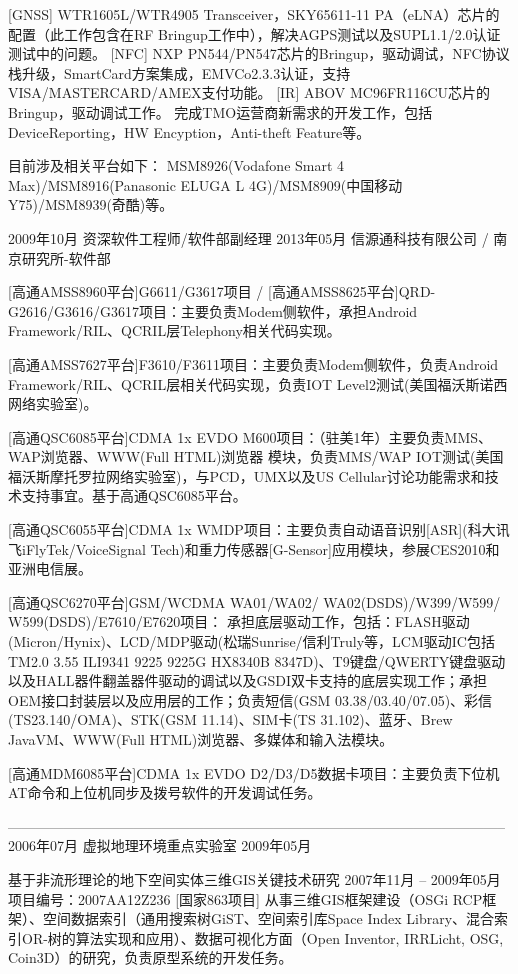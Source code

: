 \documentclass{resume}
\begin{document}
[GNSS] WTR1605L/WTR4905 Transceiver，SKY65611-11 PA（eLNA）芯片的配置（此工作包含在RF Bringup工作中），解决AGPS测试以及SUPL1.1/2.0认证测试中的问题。
[NFC] NXP PN544/PN547芯片的Bringup，驱动调试，NFC协议栈升级，SmartCard方案集成，EMVCo2.3.3认证，支持VISA/MASTERCARD/AMEX支付功能。
[IR] ABOV MC96FR116CU芯片的Bringup，驱动调试工作。
完成TMO运营商新需求的开发工作，包括DeviceReporting，HW Encyption，Anti-theft Feature等。

目前涉及相关平台如下：
MSM8926(Vodafone Smart 4 Max)/MSM8916(Panasonic ELUGA L 4G)/MSM8909(中国移动Y75)/MSM8939(奇酷)等。

2009年10月 		资深软件工程师/软件部副经理
2013年05月		信源通科技有限公司 / 南京研究所-软件部

[高通AMSS8960平台]G6611/G3617项目 / [高通AMSS8625平台]QRD-G2616/G3616/G3617项目：主要负责Modem侧软件，承担Android Framework/RIL、QCRIL层Telephony相关代码实现。

[高通AMSS7627平台]F3610/F3611项目：主要负责Modem侧软件，负责Android Framework/RIL、QCRIL层相关代码实现，负责IOT Level2测试(美国福沃斯诺西网络实验室)。

[高通QSC6085平台]CDMA 1x EVDO M600项目：（驻美1年）主要负责MMS、WAP浏览器、WWW(Full HTML)浏览器 模块，负责MMS/WAP IOT测试(美国福沃斯摩托罗拉网络实验室)，与PCD，UMX以及US Cellular讨论功能需求和技术支持事宜。基于高通QSC6085平台。

[高通QSC6055平台]CDMA 1x WMDP项目：主要负责自动语音识别[ASR](科大讯飞iFlyTek/VoiceSignal Tech)和重力传感器[G-Sensor]应用模块，参展CES2010和亚洲电信展。

[高通QSC6270平台]GSM/WCDMA WA01/WA02/ WA02(DSDS)/W399/W599/ W599(DSDS)/E7610/E7620项目：
承担底层驱动工作，包括：FLASH驱动(Micron/Hynix)、LCD/MDP驱动(松瑞Sunrise/信利Truly等，LCM驱动IC包括TM2.0 3.55 ILI9341 9225 9225G HX8340B 8347D)、T9键盘/QWERTY键盘驱动以及HALL器件翻盖器件驱动的调试以及GSDI双卡支持的底层实现工作；承担OEM接口封装层以及应用层的工作；负责短信(GSM 03.38/03.40/07.05)、彩信(TS23.140/OMA)、STK(GSM 11.14)、SIM卡(TS 31.102)、蓝牙、Brew JavaVM、WWW(Full HTML)浏览器、多媒体和输入法模块。

[高通MDM6085平台]CDMA 1x EVDO D2/D3/D5数据卡项目：主要负责下位机AT命令和上位机同步及拨号软件的开发调试任务。

-----------------------------------------------------------------------------------------------------------
2006年07月		虚拟地理环境重点实验室
2009年05月		

基于非流形理论的地下空间实体三维GIS关键技术研究	  					 2007年11月 – 2009年05月
项目编号：2007AA12Z236 [国家863项目]
从事三维GIS框架建设（OSGi RCP框架）、空间数据索引（通用搜索树GiST、空间索引库Space Index Library、混合索引OR-树的算法实现和应用）、数据可视化方面（Open Inventor, IRRLicht, OSG, Coin3D）的研究，负责原型系统的开发任务。
\end{document}
